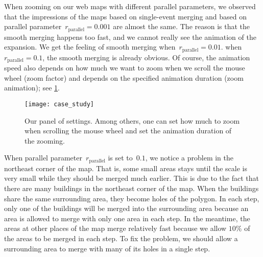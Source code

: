 \documentclass[ijgi,article,submit,moreauthors,pdftex]{Definitions/mdpi}
\begin{document}
\begin{table}[tb]
\label{tbl:parallel_param_comparison}
\end{table}

When zooming on our web maps with different parallel parameters,
we observed that the impressions of the maps based on single-event merging
and based on parallel parameter~$r_\mathrm{parallel}= 0.001$ are almost the same.
The reason is that the smooth merging happens too fast,
and we cannot really see the animation of the expansion.
We get the feeling of smooth merging when~$r_\mathrm{parallel}= 0.01$.
when~$r_\mathrm{parallel}= 0.1$, the smooth merging is already obvious.
Of course, the animation speed also depends on how much we want to zoom
when we scroll the mouse wheel (zoom factor) 
and depends on the specified animation duration (zoom animation);
see \fig\ref{fig:interaction_settings}.

\begin{figure}[tb]
\centering
\texttt{[image: case\_study]}
\caption{Our panel of settings. 
Among others, one can set how much to zoom when scrolling the mouse wheel 
and set the animation duration of the zooming.}
\label{fig:interaction_settings}
\end{figure}

When parallel parameter~$r_\mathrm{parallel}$ is set to~$0.1$,
we notice a problem in the northeast corner of the map.
That is, some small areas stays until the scale is very small
while they should be merged much earlier.
This is due to the fact that 
there are many buildings in the northeast corner of the map.
When the buildings share the same surrounding area,
they become holes of the polygon.
In each step, only one of the buildings will be merged into the surrounding area
because an area is allowed to merge with only one area in each step.
In the meantime, the areas at other places of the map merge relatively fast
because we allow $10\%$ of the areas to be merged in each step.
To fix the problem, we should allow a surrounding area 
to merge with many of its holes in a single step.
\end{document}
